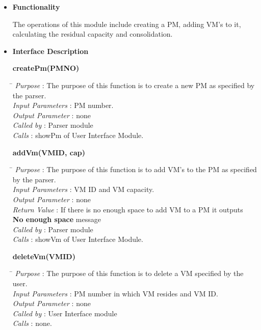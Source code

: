 \documentclass[a4paper,11pt]{article}
\begin{document}
\begin{itemize}
\item \textbf{Functionality}

The operations of this module include creating a PM, adding VM's to it, calculating the residual capacity and consolidation.

\item \textbf{Interface Description} 

\textbf{createPm(PM\textunderscore NO)}
  
\begin{tabbing}
\hspace*{4cm}\=  \kill
 \textit{Purpose} \> : The purpose of this function is to create a new PM as specified by\\ \> the parser.\\
  \textit{Input Parameters} \> : PM number. \\
  \textit{Output Parameter} \> : none \\
  \textit{Called by} \> : Parser module \\
  \textit{Calls} \> : showPm of User Interface Module.
\end{tabbing}
\pagebreak
\textbf{addVm(VM\textunderscore ID, cap)}
  
\begin{tabbing}
\hspace*{4cm}\=  \kill
 \textit{Purpose} \> : The purpose of this function is to add VM's to the PM as specified\\ \> by the parser.\\
  \textit{Input Parameters} \> : VM ID and VM capacity. \\
  \textit{Output Parameter} \> : none \\
  \textit{Return Value} \> : If there is no enough space to add VM to a PM it outputs \\ \>\textbf{No enough space} message\\
  \textit{Called by} \> : Parser module \\
  \textit{Calls} \> : showVm of User Interface Module.
\end{tabbing}

\textbf{deleteVm(VM\textunderscore ID)}
  
\begin{tabbing}
\hspace*{4cm}\=  \kill
 \textit{Purpose} \> : The purpose of this function is to delete a VM specified by the user.\\
  \textit{Input Parameters} \> : PM number in which VM resides and VM ID. \\
  \textit{Output Parameter} \> : none \\
 \textit{Called by} \> : User Interface module \\
  \textit{Calls} \> : none.
\end{tabbing}


\end{itemize}
\end{document}
